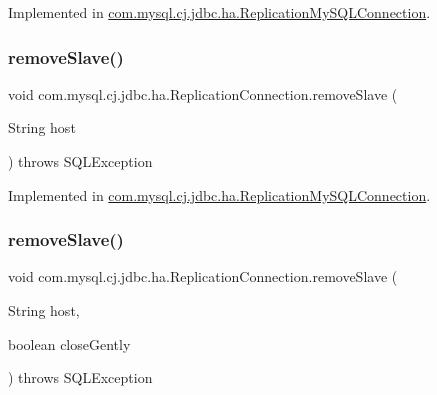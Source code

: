 Implemented in \mbox{\hyperlink{classcom_1_1mysql_1_1cj_1_1jdbc_1_1ha_1_1_replication_my_s_q_l_connection_a58345cde3a7a64f9da4d13bcdba715f1}{com.\+mysql.\+cj.\+jdbc.\+ha.\+Replication\+My\+S\+Q\+L\+Connection}}.

\mbox{\label{interfacecom_1_1mysql_1_1cj_1_1jdbc_1_1ha_1_1_replication_connection_a26c4c17241b8e9169e88484ba26bf081}} 
\subsubsection{\texorpdfstring{remove\+Slave()}{removeSlave()}\hspace{0.1cm}{\footnotesize\ttfamily [1/2]}}
{\footnotesize\ttfamily void com.\+mysql.\+cj.\+jdbc.\+ha.\+Replication\+Connection.\+remove\+Slave (\begin{DoxyParamCaption}\item[{String}]{host }\end{DoxyParamCaption}) throws S\+Q\+L\+Exception}



Implemented in \mbox{\hyperlink{classcom_1_1mysql_1_1cj_1_1jdbc_1_1ha_1_1_replication_my_s_q_l_connection_a2de6631ba38ed04c74adf82445618d17}{com.\+mysql.\+cj.\+jdbc.\+ha.\+Replication\+My\+S\+Q\+L\+Connection}}.

\mbox{\label{interfacecom_1_1mysql_1_1cj_1_1jdbc_1_1ha_1_1_replication_connection_ac4e3f61d87c2f40d760917c843b4a4aa}} 
\subsubsection{\texorpdfstring{remove\+Slave()}{removeSlave()}\hspace{0.1cm}{\footnotesize\ttfamily [2/2]}}
{\footnotesize\ttfamily void com.\+mysql.\+cj.\+jdbc.\+ha.\+Replication\+Connection.\+remove\+Slave (\begin{DoxyParamCaption}\item[{String}]{host,  }\item[{boolean}]{close\+Gently }\end{DoxyParamCaption}) throws S\+Q\+L\+Exception}



